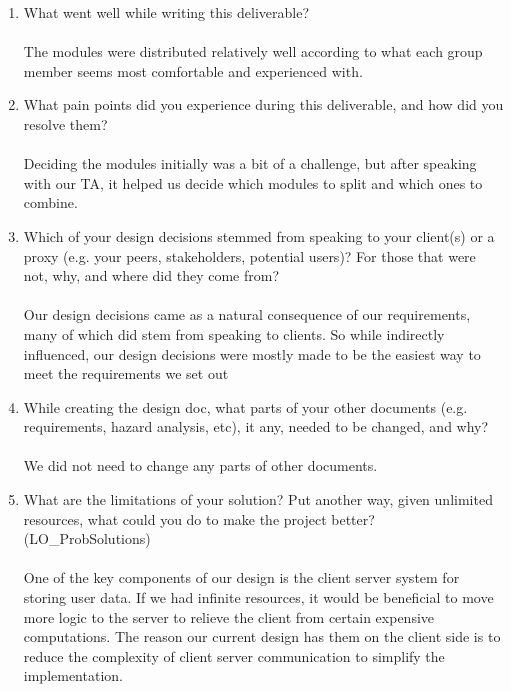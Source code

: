 \documentclass[12pt, titlepage]{article}
\begin{document}
\begin{enumerate}
  \item What went well while writing this deliverable? \\ \\
        The modules were distributed relatively well according to what each group member seems most comfortable and experienced with.
  \item What pain points did you experience during this deliverable, and how
        did you resolve them?\\ \\
        Deciding the modules initially was a bit of a challenge, but after speaking with our TA, it helped us decide which modules to split and which ones to combine.
  \item Which of your design decisions stemmed from speaking to your client(s)
        or a proxy (e.g. your peers, stakeholders, potential users)? For those that
        were not, why, and where did they come from?\\ \\
        Our design decisions came as a natural consequence of our requirements, many of which did stem from speaking to clients.
        So while indirectly influenced, our design decisions were mostly made to be the easiest way to
        meet the requirements we set out
  \item While creating the design doc, what parts of your other documents (e.g.
        requirements, hazard analysis, etc), it any, needed to be changed, and why?\\ \\
        We did not need to change any parts of other documents.

  \item What are the limitations of your solution?  Put another way, given
        unlimited resources, what could you do to make the project better? (LO\_ProbSolutions)\\ \\
        One of the key components of our design is the client server system for storing user data.
        If we had infinite resources, it would be beneficial to move more logic to the server to relieve the client from certain expensive computations.
        The reason our current design has them on the client side is to reduce the complexity of client server communication to simplify the implementation.


\end{enumerate}
\end{document}
